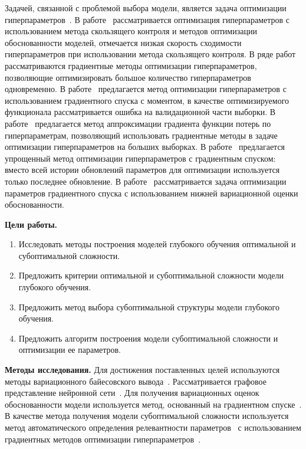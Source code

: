 \documentclass[11pt, a5paper]{dissert}
\theoremstyle{definition}
\begin{document}
Задачей, связанной с проблемой выбора модели, является задача оптимизации гиперпараметров~\cite{mackay,bishop}. В работе~\cite{tokmakova} рассматривается оптимизация гиперпараметров с использованием метода скользящего контроля и методов оптимизации обоснованности моделей, отмечается низкая скорость сходимости гиперпараметров при использовании метода скользящего контроля. В ряде работ~\cite{hyper, hyper2} рассматриваются градиентные методы оптимизации гиперпараметров, позволяющие оптимизировать большое количество гиперпараметров одновременно. В работе~\cite{hyper} предлагается метод оптимизации гиперпараметров с использованием градиентного спуска с моментом, в качестве оптимизируемого функционала рассматривается ошибка на валидационной части выборки. В работе~\cite{approx_hyper} предлагается метод аппроксимации градиента функции потерь по гиперпараметрам, позволяющий использовать градиентные методы в задаче оптимизации гиперпараметров на больших выборках. В работе~\cite{greed_hyper} предлагается упрощенный метод оптимизации гиперпараметров с градиентным спуском: вместо всей истории обновлений параметров для оптимизации используется только последнее обновление. В работе~\cite{sgd_cont} рассматривается задача оптимизации параметров градиентного спуска с использованием нижней вариационной оценки обоснованности. 

\vspace{0.5cm}
\textbf{Цели работы.}
\vspace{0.2cm}
\begin{enumerate}
\item Исследовать методы построения моделей глубокого обучения оптимальной и субоптимальной сложности.
\item Предложить критерии оптимальной и субоптимальной сложности модели глубокого обучения.
\item Предложить метод выбора субоптимальной структуры модели глубокого обучения.
\item Предложить алгоритм построения модели субоптимальной сложности и оптимизации ее параметров.
\end{enumerate}


\vspace{0.5cm}
\textbf{Методы исследования.} Для достижения поставленных целей используются методы вариационного байесовского вывода~\cite{mackay, bishop, early}. Рассматривается графовое представление нейронной сети~\cite{reinf,darts}. Для получения вариационных оценок обоснованности модели используется метод, основанный на градиентном спуске~\cite{sgd_cont, early}. В качестве метода получения модели субоптимальной сложности используется метод автоматического определения релевантности параметров~\cite{mackay,vae_ard} с использованием градиентных методов оптимизации гиперпараметров~\cite{hyper, hyper2, greed_hyper, approx_hyper}.
\end{document}
